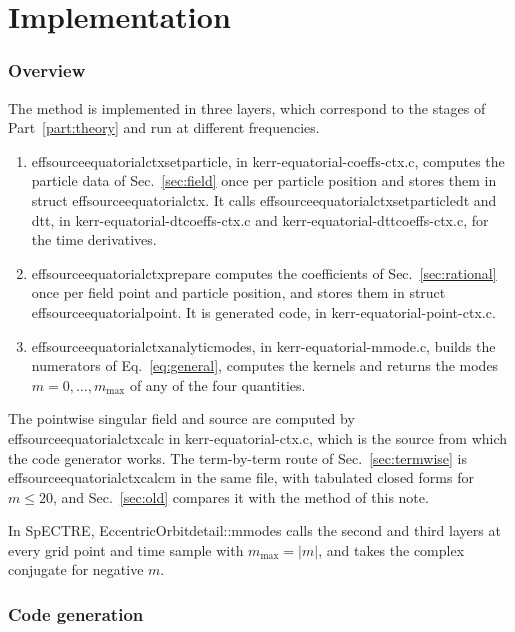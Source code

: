 \documentclass[11pt]{article}
\newcommand{\codeus}{\textunderscore\allowbreak}
\newcommand{\codehy}{-\allowbreak}
\newcommand{\code}[1]{{\ttfamily\let\_\codeus\let\-\codehy #1}}
\begin{document}
\part{Implementation}
\label{part:implementation}

\section{Overview}
\label{sec:overview}

The method is implemented in three layers, which correspond to the stages of
Part~\ref{part:theory} and run at different frequencies.
\begin{enumerate}
  \item \code{effsource\_equatorial\_ctx\_set\_particle}, in
    \code{kerr\-equatorial\-coeffs\-ctx.c}, computes the particle data of
    Sec.~\ref{sec:field} once per particle position and stores them in
    \code{struct effsource\_equatorial\_ctx}. It calls
    \code{effsource\_equatorial\_ctx\_set\_particle\_dt} and
    \code{\_dtt}, in \code{kerr\-equatorial\-dtcoeffs\-ctx.c} and
    \code{kerr\-equatorial\-dttcoeffs\-ctx.c}, for the time derivatives.
  \item \code{effsource\_equatorial\_ctx\_prepare} computes the coefficients of
    Sec.~\ref{sec:rational} once per field point and particle position, and
    stores them in \code{struct effsource\_equatorial\_point}. It is generated
    code, in \code{kerr\-equatorial\-point\-ctx.c}.
  \item \code{effsource\_equatorial\_ctx\_analytic\_modes}, in
    \code{kerr\-equatorial\-mmode.c}, builds the numerators of
    Eq.~\eqref{eq:general}, computes the kernels and returns the modes
    $m=0,\dots,m_{\max}$ of any of the four quantities.
\end{enumerate}
The pointwise singular field and source are computed by
\code{effsource\_equatorial\_ctx\_calc} in \code{kerr\-equatorial\-ctx.c}, which
is the source from which the code generator works. The term-by-term route of
Sec.~\ref{sec:termwise} is \code{effsource\_equatorial\_ctx\_calc\_m} in the
same file, with tabulated closed forms for $m\le20$, and Sec.~\ref{sec:old}
compares it with the method of this note.

In SpECTRE, \code{EccentricOrbit\_detail::m\_modes} calls the second and third
layers at every grid point and time sample with $m_{\max}=|m|$, and takes the
complex conjugate for negative $m$.

\section{Code generation}
\label{sec:codegen}
\end{document}
